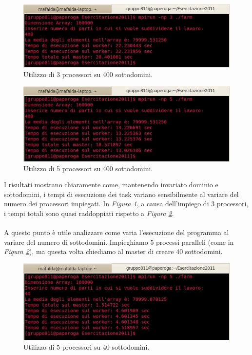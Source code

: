 \begin{figure}[htp]
\centering
\includegraphics[width=\textwidth]{Immagini_relazione/6_esec3p400.jpeg}
\caption{Utilizzo di 3 processori su 400 sottodomini.}
\label{fig:3proc400}
\end{figure}

\begin{figure}[htp]
\centering
\includegraphics[width=\textwidth]{Immagini_relazione/1_esec5p400.jpeg}
\caption{Utilizzo di 5 processori su 400 sottodomini.}
\label{fig:5proc400}
\end{figure}
\newpage
I risultati mostrano chiaramente come, mantenendo invariato dominio e sottodomini, i tempi di esecuzione dei task variano sensibilmente al variare del numero dei processori impiegati. In \emph{Figura \ref{fig:3proc400}}, a causa dell'impiego di 3 processori, i tempi totali sono quasi raddoppiati rispetto a \emph{Figura \ref{fig:5proc400}}.
\\
\\
A questo punto \`e utile analizzare come varia l'esecuzione del programma al variare del numero di sottodomini. Impieghiamo 5 processi paralleli (come in \emph{Figura \ref{fig:5proc400}}), ma questa volta chiediamo al master di creare 40 sottodomini.


\begin{figure}[htp]
\centering
\includegraphics[width=\textwidth]{Immagini_relazione/4_esec5p40.jpeg}
\caption{Utilizzo di 5 processori su 40 sottodomini.}
\label{fig:5proc40}
\end{figure}


